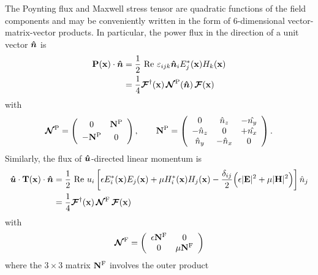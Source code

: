 \documentclass[letterpaper]{article}
\begin{document}
The Poynting flux and Maxwell stress tensor are quadratic functions
of the field components and may be conveniently written in the form
of 6-dimensional vector-matrix-vector products. 
In particular, the power flux in the direction of a unit vector 
$\boldsymbol{\hat{n}}$ is
\begin{align}
 \mathbf{P}(\mathbf{x}) \cdot \boldsymbol{\hat{n}}
   &=\frac{1}{2}\text{ Re }\varepsilon_{ijk}\boldsymbol{\hat{n}}_i E^*_j(\mathbf{x}) H_k(\mathbf{x})
\nonumber\\
   &=\frac{1}{4}\boldsymbol{\mathcal{F}}^\dagger(\mathbf{x}) \, \boldsymbol{\mathcal{N}}^{\text{\scriptsize P}}(\boldsymbol{\hat{n}}) \, \boldsymbol{\mathcal{F}}(\mathbf{x})
\label{PVMVP}
\end{align}
with
$$
   \boldsymbol{\mathcal{N}}^{\text{\scriptsize P}}=
   \left(\begin{array}{cc}
   0       & \mathbf{N}^{\text{\scriptsize P}}   \\ [3pt]
  -\mathbf{N}^{\text{\scriptsize P}} & 0
   \end{array}\right), 
\qquad 
   \mathbf{N}^{\text{\scriptsize P}}
   =
   \left(\begin{array}{ccc}
   0          &  \hat{n}_z & -\hat{n_y} \\
  -\hat{n}_z  &  0         & +\hat{n_x} \\
   \hat{n}_y  & -\hat{n}_x & 0
   \end{array}\right).
$$
Similarly, the flux of $\boldsymbol{\hat{u}}$-directed linear momentum is
\begin{align}
 \boldsymbol{\hat{u}} \cdot \mathbf{T}(\mathbf{x}) \cdot \boldsymbol{\hat{n}} 
&=\frac{1}{2}\text{ Re } u_i
  \left[ \epsilon E^*_i(\mathbf{x}) E_j(\mathbf{x}) 
             +\mu H^*_i(\mathbf{x}) H_j(\mathbf{x}) 
       -\frac{\delta_{ij}}{2}
         \Big( \epsilon |\mathbf{E}|^2
              +\mu      |\mathbf{H}|^2
         \Big)
 \right] \hat {n}_j
\nonumber\\
&= \frac{1}{4}\boldsymbol{\mathcal{F}}^\dagger(\mathbf{x}) 
   \, \boldsymbol{\mathcal{N}}^{\text{\scriptsize F}} \, \boldsymbol{\mathcal{F}}(\mathbf{x})
\label{IFVMVP}
\end{align}
with
$$
   \boldsymbol{\mathcal{N}}^{\text{\scriptsize F}}
    =
   \left(\begin{array}{cc}
   \epsilon \mathbf{N}^{\text{\scriptsize F}} & 0 \\
            0        & \mu \mathbf{N}^{\text{\scriptsize F}}
   \end{array}\right)
$$
where the $3\times 3$ matrix $\mathbf{N}^{\text{\scriptsize F}}$ 
involves the outer product
\end{document}
